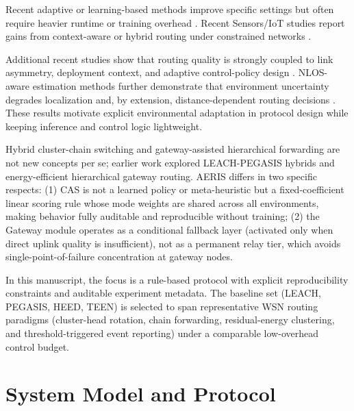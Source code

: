 ﻿\documentclass[sensors,article,submit,moreauthors,pdftex]{Definitions/mdpi}
\begin{document}
Recent adaptive or learning-based methods improve specific settings but often require heavier runtime or training overhead \cite{Ren2024,Okine2024,Chen2019Survey,Naeem2024DRL,Scientific2025DRLGNN,Nature2024NNILEACH,AI2025Survey,Manogaran2025DDQN,Tan2026MOGALSA}. Recent Sensors/IoT studies report gains from context-aware or hybrid routing under constrained networks \cite{ElFouly2023ILP,Dan2024EMRAR,Bhukya2025Hybrid,Kaddi2024GWOCSMA,Wang2024Geographic,Tariq2024A,Hassanien2025DLHEED,Ti2026HEOCP,Juwaied2025DEEC}.

Additional recent studies show that routing quality is strongly coupled to link asymmetry, deployment context, and adaptive control-policy design \cite{Jain2025Optimized,Ogundile2025PPRP,Singh2025Enhanced,Tossa2025Deployment,Prince2025Hotspot,Qin2026WBAN}. NLOS-aware estimation methods further demonstrate that environment uncertainty degrades localization and, by extension, distance-dependent routing decisions \cite{Qin2024NLOSError}. These results motivate explicit environmental adaptation in protocol design while keeping inference and control logic lightweight.

Hybrid cluster-chain switching and gateway-assisted hierarchical forwarding are not new concepts per se; earlier work explored LEACH-PEGASIS hybrids and energy-efficient hierarchical gateway routing. AERIS differs in two specific respects: (1) CAS is not a learned policy or meta-heuristic but a fixed-coefficient linear scoring rule whose mode weights are shared across all environments, making behavior fully auditable and reproducible without training; (2) the Gateway module operates as a conditional fallback layer (activated only when direct uplink quality is insufficient), not as a permanent relay tier, which avoids single-point-of-failure concentration at gateway nodes.

In this manuscript, the focus is a rule-based protocol with explicit reproducibility constraints and auditable experiment metadata.
The baseline set (LEACH, PEGASIS, HEED, TEEN) is selected to span representative WSN routing paradigms (cluster-head rotation, chain forwarding, residual-energy clustering, and threshold-triggered event reporting) under a comparable low-overhead control budget.

\section{System Model and Protocol}
\end{document}
